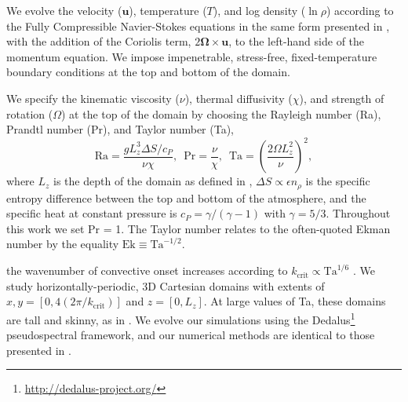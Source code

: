 \documentclass[twocolumn, amsmath, amsfonts, amssymb, trackchanges]{aastex62}
\begin{document}
We evolve the velocity ($\bm{u}$), temperature ($T$), 
and log density ($\ln\rho$) according to the Fully Compressible Navier-Stokes equations
in the same form presented in \AB, with the
addition of the Coriolis term, \mbox{$2\bm{\Omega}\times\bm{u}$}, to the left-hand side
of the momentum equation. 
We impose impenetrable, stress-free, fixed-temperature boundary conditions at the top and bottom of the domain.


We specify the kinematic viscosity ($\nu$), thermal diffusivity ($\chi$), and strength of
rotation ($\Omega$) at the top of the domain by choosing the Rayleigh number 
(Ra), Prandtl number (Pr), and Taylor number (Ta),
\begin{equation}
    \text{Ra} = \frac{g L_z^3 \Delta S / c_P}{\nu \chi}, \,\,\,
    \text{Pr} = \frac{\nu}{\chi}, \,\,\,
    \text{Ta} = \left(\frac{2 \Omega L_z^2}{\nu}\right)^2,
	\label{eqn:input_parameters}
\end{equation}
where $L_z$ is the depth of the domain as defined in \AB, 
$\Delta S \propto \epsilon n_\rho$ is the specific entropy difference between
the top and bottom of the atmosphere, and the specific heat at constant pressure is $c_P = \gamma/(\gamma-1)$
with $\gamma = 5/3$.
Throughout this work we set Pr = 1. The Taylor number relates to the often-quoted
Ekman number by the equality $\text{Ek} \equiv \text{Ta}^{-1/2}$.


 the wavenumber of convective onset increases according to $k_{\text{crit}} \propto \text{Ta}^{1/6}$
\citep{Chandrasekhar,calkins&all2015a}.
We study horizontally-periodic, 3D Cartesian domains with extents of
$x, y = [0, 4(2\pi/k_{\text{crit}})]$ and $z = [0, L_z]$. At large values of Ta, these
domains are tall and skinny, as in \cite{stellmach&all2014}.
We evolve our simulations using the Dedalus\footnote{\url{http://dedalus-project.org/}} 
pseudospectral framework, and our numerical methods are identical to those presented
in \AB. 
\end{document}
